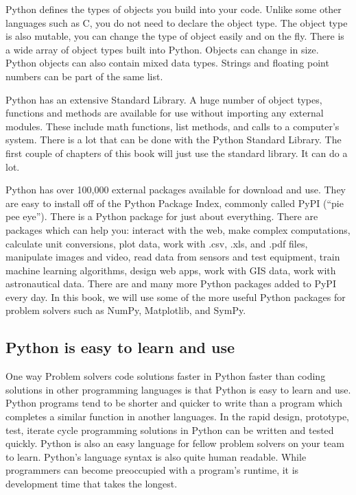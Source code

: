 \documentclass{book}
\begin{document}
Python defines the types of objects you build into your code. Unlike
some other languages such as C, you do not need to declare the object
type. The object type is also mutable, you can change the type of object
easily and on the fly. There is a wide array of object types built into
Python. Objects can change in size. Python objects can also contain
mixed data types. Strings and floating point numbers can be part of the
same list.

Python has an extensive Standard Library. A huge number of object types,
functions and methods are available for use without importing any
external modules. These include math functions, list methods, and calls
to a computer's system. There is a lot that can be done with the Python
Standard Library. The first couple of chapters of this book will just
use the standard library. It can do a lot.

Python has over 100,000 external packages available for download and
use. They are easy to install off of the Python Package Index, commonly
called PyPI (``pie pee eye''). There is a Python package for just about
everything. There are packages which can help you: interact with the
web, make complex computations, calculate unit conversions, plot data,
work with .csv, .xls, and .pdf files, manipulate images and video, read
data from sensors and test equipment, train machine learning algorithms,
design web apps, work with GIS data, work with astronautical data. There
are and many more Python packages added to PyPI every day. In this book,
we will use some of the more useful Python packages for problem solvers
such as NumPy, Matplotlib, and SymPy.
    




    
        \subsection{Python is easy to learn and
use}\label{python-is-easy-to-learn-and-use}

One way Problem solvers code solutions faster in Python faster than
coding solutions in other programming languages is that Python is easy
to learn and use. Python programs tend to be shorter and quicker to
write than a program which completes a similar function in another
languages. In the rapid design, prototype, test, iterate cycle
programming solutions in Python can be written and tested quickly.
Python is also an easy language for fellow problem solvers on your team
to learn. Python's language syntax is also quite human readable. While
programmers can become preoccupied with a program's runtime, it is
development time that takes the longest.
\end{document}

